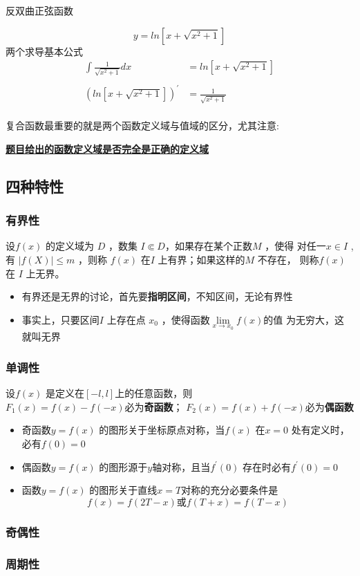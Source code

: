 \documentclass[cn,normal,11pt,black]{elegantnote}
\begin{document}
    反双曲正弦函数 

    \begin{equation}
        y = ln[x+\sqrt{x^2 + 1}] 
    \end{equation}
    两个求导基本公式
    \begin{align*}
        \int \frac{1}{\sqrt{x^2 + 1}}dx & = ln[x+ \sqrt{x^2+1}] \\
        \\
        (ln[x+\sqrt{x^2+1}])^{'} &= \frac{1}{\sqrt{x^2+1}} \\
    \end{align*}

    复合函数最重要的就是两个函数定义域与值域的区分，尤其注意:
    
    \underline{\textbf{题目给出的函数定义域是否完全是正确的定义域}}

    \subsection{四种特性}
    \subsubsection{有界性}
        设$ f(x) $ 的定义域为 $ D  $ ，数集 $ I \Subset D $，如果存在某个正数$ M $ ，使得
    对任一$ x \in I $ ,有 $ |f(X)| \leq m $ ，则称 $ f(x) $ 在$I$ 上有界；如果这样的$M$ 不存在，
    则称$f(x)$ 在 $ I $ 上无界。
        \begin{note}
            \begin{itemize}
            \item 有界还是无界的讨论，首先要\textbf{指明区间}，不知区间，无论有界性
            \item 事实上，只要区间$I$ 上存在点 $x_0$ ，使得函数$\lim\limits_{x \to x_0}f(x)$的值
            为无穷大，这就叫无界
            \end{itemize}
        \end{note}
    \subsubsection{单调性}
    设$f(x)$ 是定义在$ [-l,l] $上的任意函数，则 \\
    $ F_1(x)=f(x)-f(-x) $必为\textbf{奇函数}； $ F_2(x)=f(x)+f(-x) $必为\textbf{偶函数}
    \begin{itemize}
        \item 奇函数$y=f(x)$ 的图形关于坐标原点对称，当$f(x)$ 在$x=0$ 处有定义时，必有$f(0)=0$
        \item 偶函数$y=f(x)$ 的图形源于$y$轴对称，且当$f^{'}(0)$ 存在时必有$f^{'}(0)=0$
        \item 函数$y=f(x)$ 的图形关于直线$x=T$对称的充分必要条件是
        $$ f(x)=f(2T-x) \text{或} f(T+x)=f(T-x) $$
    \end{itemize}
    \subsubsection{奇偶性}
    \subsubsection{周期性}


    
\end{document}
